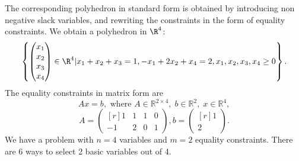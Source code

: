  The corresponding polyhedron in standard form is obtained by
  introducing non negative slack variables, and rewriting the
  constraints in the form of equality constraints. We obtain a
  polyhedron in $\R^4$:
  \[
 \left\{
\begin{pmatrix}
x_1\\
x_2 \\
x_3 \\
x_4
\end{pmatrix} \in \R^4
| x_1+x_2+x_3  =1,
-x_1+2x_2+x_4 =2, x_1, x_2, x_3, x_4 \geq 0\right\}.
  \]
The equality constraints in matrix form are
\[
Ax= b,
\text{ where }
 A \in \mathbb{R}^{2\times 4},\; b \in \mathbb{R}^2,\; x \in \mathbb{R}^4,
\]
\[
A =
\begin{pmatrix*}[r]
1&1&1&0\\
-1&2&0&1
\end{pmatrix*},
b =
\begin{pmatrix*}[r]
1\\
2
\end{pmatrix*}.
\]
We have a problem with $n=4$ variables and $m=2$ equality constraints.
 There are 6 ways to select 2 basic variables out of 4. 
